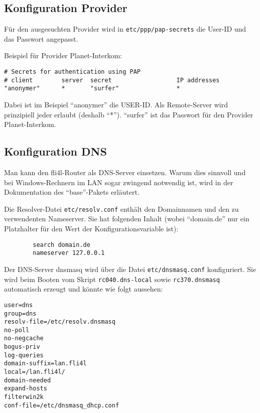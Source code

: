 \subsection{Konfiguration Provider}

Für den ausgesuchten Provider wird in \texttt{etc/ppp/pap-secrets}
die User-ID und das Passwort angepasst.

Beispiel für Provider Planet-Interkom:

\begin{example}
\begin{verbatim}
# Secrets for authentication using PAP
# client        server  secret                  IP addresses
"anonymer"      *       "surfer"                *
\end{verbatim}
\end{example}

Dabei ist im Beispiel "`anonymer"' die USER-ID. Als Remote-Server wird
prinzipiell jeder erlaubt (deshalb "`*"'). "`surfer"' ist das Passwort für
den Provider Planet-Interkom.


\subsection{Konfiguration DNS}


Man kann den fli4l-Router als DNS-Server einsetzen. Warum dies
sinnvoll und bei Windows-Rechnern im LAN sogar zwingend notwendig
ist, wird in der Dokumentation des "`base"'-Pakets erläutert.

Die Resolver-Datei \texttt{etc/resolv.conf} enthält den Domainnamen und den zu
verwendenten Nameserver. Sie hat folgenden Inhalt (wobei "`domain.de"' nur
ein Platzhalter für den Wert der Konfigurationsvariable
 ist):

\begin{example}
\begin{verbatim}
        search domain.de
        nameserver 127.0.0.1
\end{verbatim}
\end{example}

Der DNS-Server dnsmasq wird über die Datei \texttt{etc/dnsmasq.conf}
konfiguriert. Sie wird beim Booten vom Skript \texttt{rc040.dns-local} sowie
\texttt{rc370.dnsmasq} automatisch erzeugt und könnte wie folgt aussehen:

\begin{example}
\begin{verbatim}
user=dns
group=dns
resolv-file=/etc/resolv.dnsmasq
no-poll
no-negcache
bogus-priv
log-queries
domain-suffix=lan.fli4l
local=/lan.fli4l/
domain-needed
expand-hosts
filterwin2k
conf-file=/etc/dnsmasq_dhcp.conf
\end{verbatim}
\end{example}


